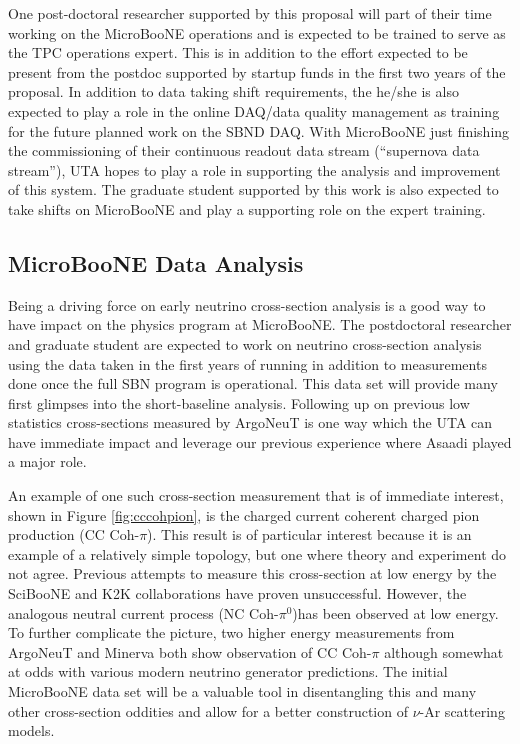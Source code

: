 One post-doctoral researcher supported by this proposal will part of their time working on the MicroBooNE operations and is expected to be trained to serve as the TPC operations expert. This is in addition to the effort expected to be present from the postdoc supported by startup funds in the first two years of the proposal. In addition to data taking shift requirements, the he/she is also expected to play a role in the online DAQ/data quality management as training for the future planned work on the SBND DAQ. With MicroBooNE just finishing the commissioning of their continuous readout data stream (``supernova data stream''), UTA hopes to play a role in supporting the analysis and improvement of this system. The graduate student supported by this work is also expected to take shifts on MicroBooNE and play a supporting role on the expert training.


\subsection{MicroBooNE Data Analysis}\label{sec:UbooneDataAnalysis}
Being a driving force on early neutrino cross-section analysis is a good way to have impact on the physics program at MicroBooNE. The postdoctoral researcher and graduate student are expected to work on neutrino cross-section analysis using the data taken in the first years of running in addition to measurements done once the full SBN program is operational. This data set will provide many first glimpses into the short-baseline analysis. Following up on previous low statistics cross-sections measured by ArgoNeuT is one way which the UTA can have immediate impact and leverage our previous experience where Asaadi played a major role. 

An example of one such cross-section measurement that is of immediate interest, shown in Figure \ref{fig:cccohpion}, is the charged current coherent charged pion production (CC Coh-$\pi$). This result is of particular interest because it is an example of a relatively simple topology, but one where theory and experiment do not agree. Previous attempts to measure this cross-section at low energy by the SciBooNE and K2K collaborations have proven unsuccessful. However, the analogous neutral current process (NC Coh-$\pi^{0}$)has been observed at low energy. To further complicate the picture, two higher energy measurements from ArgoNeuT and Minerva both show observation of CC Coh-$\pi$ although somewhat at odds with various modern neutrino generator predictions. The initial MicroBooNE data set will be a valuable tool in disentangling this and many other cross-section oddities and allow for a better construction of $\nu$-Ar scattering models.
 
